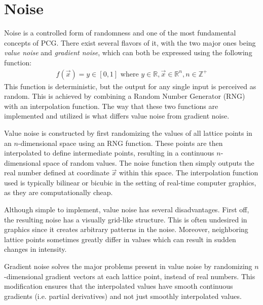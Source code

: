 \section{Noise}

Noise is a controlled form of randomness and one of the most fundamental concepts of PCG.
There exist several flavors of it, with the two major ones being \textit{value noise} and \textit{gradient noise}, which can both be expressed using the following function:
\begin{gather}
  f(\vec x) = y \in [0, 1] \text{ where }
  y \in \mathbb{R},
  \vec x \in \mathbb{R}^n,
  n \in \mathbb{Z}^+
\end{gather}
This function is deterministic, but the output for any single input is perceived as random.
This is achieved by combining a Random Number Generator (RNG) with an interpolation function.
The way that these two functions are implemented and utilized is what differs value noise from gradient noise.

Value noise is constructed by first randomizing the values of all lattice points in an $n$-dimensional space using an RNG function.
These points are then interpolated to define intermediate points, resulting in a continuous $n$-dimensional space of random values.
The noise function then simply outputs the real number defined at coordinate $\vec x$ within this space.
The interpolation function used is typically bilinear or bicubic in the setting of real-time computer graphics, as they are computationally cheap.

Although simple to implement, value noise has several disadvantages.
First off, the resulting noise has a visually grid-like structure.
This is often undesired in graphics since it creates arbitrary patterns in the noise.
Moreover, neighboring lattice points sometimes greatly differ in values which can result in sudden changes in intensity.

Gradient noise solves the major problems present in value noise by randomizing $n$-dimensional gradient vectors at each lattice point, instead of real numbers.
This modification ensures that the interpolated values have smooth continuous gradients (i.e. partial derivatives) and not just smoothly interpolated values.

